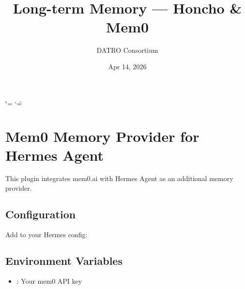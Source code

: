 \documentclass[a4paper,10pt,english]{sphinxmanual}
\title{Long-term Memory — Honcho & Mem0}
\date{Apr 14, 2026}
\author{DATRO Consortium}
\begin{document}
\ifdefined\shorthandoff
  \ifnum\catcode`\=\string=\active\shorthandoff{=}\fi
  \ifnum\catcode`\"=\active{}\fi
\fi

\pagestyle{empty}
\sphinxmaketitle
\pagestyle{plain}
\sphinxtableofcontents
\pagestyle{normal}
\label{\detokenize{index::doc}}


\sphinxstepscope


\chapter{Mem0 Memory Provider for Hermes Agent}
\label{\detokenize{mem0-memory-plugin:mem0-memory-provider-for-hermes-agent}}\label{\detokenize{mem0-memory-plugin::doc}}
\sphinxAtStartPar
This plugin integrates mem0.ai with Hermes Agent as an additional memory provider.


\section{Configuration}
\label{\detokenize{mem0-memory-plugin:configuration}}
\sphinxAtStartPar
Add to your Hermes config:

\begin{sphinxVerbatim}[commandchars=\\\{\}]
\end{sphinxVerbatim}


\section{Environment Variables}
\label{\detokenize{mem0-memory-plugin:environment-variables}}\begin{itemize}
\item {} 
\sphinxAtStartPar
{}: Your mem0 API key

\end{itemize}
\end{document}
